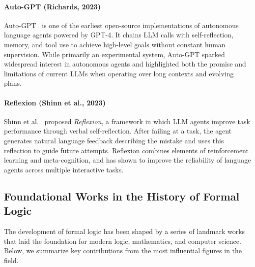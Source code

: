 \paragraph{Auto-GPT (Richards, 2023)}  
Auto-GPT~\cite{torantulino2023autogpt} is one of the earliest open-source implementations of autonomous language agents powered by GPT-4. It chains LLM calls with self-reflection, memory, and tool use to achieve high-level goals without constant human supervision. While primarily an experimental system, Auto-GPT sparked widespread interest in autonomous agents and highlighted both the promise and limitations of current LLMs when operating over long contexts and evolving plans.

\paragraph{Reflexion (Shinn et al., 2023)}  
Shinn et al.~\cite{shinn2023reflexion} proposed \emph{Reflexion}, a framework in which LLM agents improve task performance through verbal self-reflection. After failing at a task, the agent generates natural language feedback describing the mistake and uses this reflection to guide future attempts. Reflexion combines elements of reinforcement learning and meta-cognition, and has shown to improve the reliability of language agents across multiple interactive tasks.

\subsection{Foundational Works in the History of Formal Logic}

The development of formal logic has been shaped by a series of landmark works that laid the foundation for modern logic, mathematics, and computer science. Below, we summarize key contributions from the most influential figures in the field.

